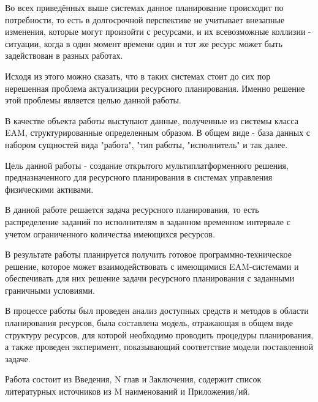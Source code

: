 Во всех приведённых выше системах данное планирование происходит по потребности, то есть в долгосрочной перспективе не учитывает внезапные изменения, которые могут произойти с ресурсами, и их всевозможные коллизии - ситуации, когда в один момент времени один и тот же ресурс может быть задействован в разных работах.

Исходя из этого можно сказать, что в таких системах стоит до сих пор нерешенная проблема актуализации ресурсного планирования. Именно решение этой проблемы является целью данной работы.

В качестве объекта работы выступают данные, полученные из системы класса EAM, структурированные определенным образом. В общем виде - база данных с набором сущностей вида "работа", "тип работы, "исполнитель" и так далее.

Цель данной работы - создание открытого мультиплатформенного решения, предназначенного для ресурсного планирования в системах управления физическими активами.

В данной работе решается задача ресурсного планирования, то есть распределение заданий по исполнителям в заданном временном интервале с учетом ограниченного количества имеющихся ресурсов.

В результате работы планируется получить готовое программно-техническое решение, которое может взаимодействовать с имеющимися EAM-системами и обеспечивать для них решение задачи ресурсного планирования с заданными граничными условиями.


В процессе работы был проведен анализ доступных средств и методов в области планирования ресурсов, была составлена модель, отражающая в общем виде структуру ресурсов, для которой необходимо проводить процедуры планирования, а также проведен эксперимент, показывающий соответствие модели поставленной задаче.

Работа состоит из Введения, N глав и Заключения, содержит список литературных источников из M наименований и Приложения/ий.

\clearpage
